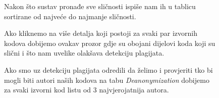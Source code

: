 \begin{figure}[H]
	\centering
	\caption{Nakon što sustav pronađe sve sličnosti ispiše nam ih u tablicu sortirane od najveće do najmanje sličnosti.}
\end{figure}

\begin{figure}[H]
	\centering
	\caption{Ako kliknemo na više detalja koji postoji za svaki par izvornih kodova dobijemo ovakav prozor gdje su obojani dijelovi koda koji su slični i što nam uvelike olakšava detekciju plagijata.}
\end{figure}

\begin{figure}[H]
	\centering
	\caption{Ako smo uz detekciju plagijata odredili da želimo i provjeriti tko bi mogli biti autori naših kodova na tabu \textit{Deanonymization} dobijemo za svaki izvorni kod listu od 3 najvjerojatnija autora.}
\end{figure}


